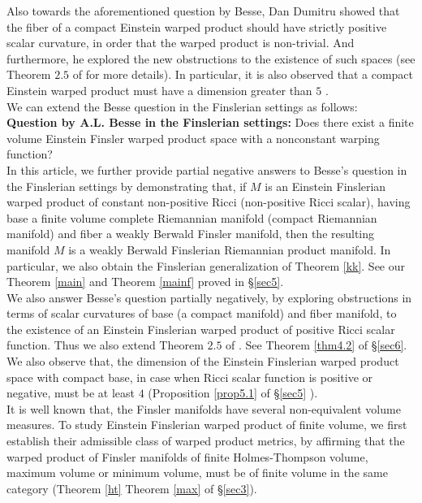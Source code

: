 \documentclass[pdflatex,sn-mathphys-num]{sn-jnl}%
\theoremstyle{thmstyleone}%
\theoremstyle{thmstyletwo}%
\theoremstyle{thmstylethree}%
\begin{document}
 \vspace{0.15in}
 
Also towards the aforementioned question by Besse,
Dan Dumitru \cite{dam} showed that the fiber of a compact Einstein warped product should have strictly positive scalar curvature, in order that the warped product is non-trivial. And furthermore, he explored the new obstructions to the existence of such spaces
(see Theorem $2.5$ of \cite{dam} for more details).
In particular, it is also observed that a compact Einstein warped product must have a dimension greater than $5$
\cite{dam}.\\

We can extend the Besse question in the Finslerian settings as follows:\\
{\bf Question by A.L. Besse in the Finslerian settings:}
Does  there exist a finite volume Einstein Finsler warped product space with a nonconstant warping function? \\

In this article, we further provide partial negative   answers to Besse's question in the Finslerian settings by demonstrating that, if  $M$ is an Einstein Finslerian warped product of constant non-positive Ricci 
(non-positive Ricci scalar),
 having base a finite  volume complete Riemannian manifold
 (compact Riemannian manifold) and fiber a weakly Berwald Finsler manifold, then 
the resulting manifold $M$ is a weakly Berwald
Finslerian Riemannian product  manifold. In particular, we
 also obtain the Finslerian generalization of  Theorem
 \ref{kk}. See our Theorem \ref{main} and Theorem \ref{mainf}
 proved in \S\ref{sec5}.\\ 
We also answer Besse's question partially negatively,
by exploring obstructions in terms of scalar curvatures 
of base (a compact manifold) and fiber manifold, to the existence of an Einstein Finslerian warped product of positive Ricci scalar function. Thus we also 
extend Theorem $2.5$ of \cite{dam}. See Theorem \ref{thm4.2}
of \S\ref{sec6}.  \\
We also observe that, the dimension of the Einstein Finslerian warped product space with compact base, in case when Ricci scalar 
function is positive or negative, must be at least $4$
(Proposition \ref{prop5.1} of  \S\ref{sec5} ). \\

It is well known that, the Finsler manifolds have 
several non-equivalent volume measures.
To study Einstein Finslerian warped product of 
finite volume, we first establish  their admissible class of 
warped product metrics, by affirming that the warped product
of Finsler manifolds of finite Holmes-Thompson volume,
maximum volume or minimum volume, must be of finite volume
in the same category (Theorem \ref{ht} Theorem \ref{max} of \S\ref{sec3}).\\
\end{document}
